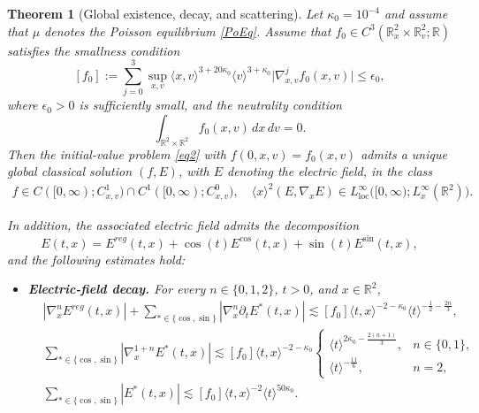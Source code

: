 \documentclass[reqno,11pt]{amsart}
\numberwithin{equation}{section}
\newtheorem{theorem}{Theorem}[section]
\begin{document}
\begin{theorem}[Global existence, decay, and scattering]\label{mainthm}
	Let $\kappa_0=10^{-4}$ and assume that $\mu$ denotes the Poisson equilibrium \eqref{PoEq}. Assume that $f_0\in C^3(\mathbb{R}_x^2\times\mathbb{R}_v^2;\mathbb{R})$ satisfies the smallness condition
	\begin{equation}\label{a16'}
		[f_0]:=\sum_{j=0}^{3}\sup_{x,v}\langle x,v\rangle^{3+20\kappa_0}\langle v\rangle^{3+\kappa_0}\big|\nabla_{x,v}^j f_0(x,v)\big|
		\leq \epsilon_0,
	\end{equation}
	where $\epsilon_0>0$ is sufficiently small, and the neutrality condition
	\begin{equation}\label{a16}
		\int_{\mathbb{R}^2\times\mathbb{R}^2}f_0(x,v)\,dx\,dv=0.
	\end{equation}
	Then the initial-value problem \eqref{eq2} with
	$f(0,x,v)=f_0(x,v)$ admits a unique global classical solution
	$(f,E)$, with $E$ denoting the electric field, in the class
	\begin{gather*}
		f\in C([0,\infty);C^1_{x,v})
		\cap C^1([0,\infty);C^0_{x,v}),\quad
		\langle x\rangle^2(E,\nabla_xE)
		\in L^\infty_{\mathrm{loc}}
		\bigl([0,\infty);L^\infty_x(\mathbb R^2)\bigr).
	\end{gather*}
	
	In addition, the associated electric field admits the decomposition
	\begin{equation}
		E(t,x)
		=
		E^{reg}(t,x)
		+\cos(t)E^{\cos}(t,x)
		+\sin(t)E^{\sin}(t,x),
	\end{equation}
	and the following estimates hold:
	
	\begin{itemize}
		\item \textbf{Electric-field decay.}
		For every $n\in\{0,1,2\}$, $t>0$, and $x\in\mathbb{R}^2$,
		\begin{align*}
			&|\nabla_x^n E^{reg}(t,x)|
			+\sum_{*\in\{\cos,\sin\}}|\nabla_x^n\partial_t E^{*}(t,x)|
			\lesssim [f_0]\langle t,x\rangle^{-2-\kappa_0}\langle t\rangle^{-\frac12-\frac{2n}{3}},\\
			&\sum_{*\in\{\cos,\sin\}}|\nabla_x^{1+n}E^{*}(t,x)|
			\lesssim [f_0]\langle t,x\rangle^{-2-\kappa_0}
			\begin{cases}
				\langle t\rangle^{2\kappa_0-\frac{2(n+1)}{3}},
				&n\in\{0,1\},\\
				\langle t\rangle^{-\frac{11}{6}},&n=2,
			\end{cases}\\
			&\sum_{*\in\{\cos,\sin\}}|E^{*}(t,x)|
			\lesssim [f_0]\langle t,x\rangle^{-2}\langle t\rangle^{50\kappa_0}.
		\end{align*}
		

\end{itemize}
\end{theorem}
\end{document}
